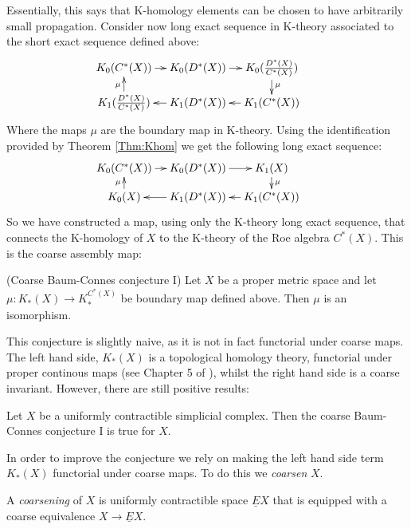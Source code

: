 Essentially, this says that K-homology elements can be chosen to have arbitrarily small propagation. Consider now long exact sequence in K-theory associated to the short exact sequence defined above:
\begin{equation*}
\xymatrix@=1em{
K_{0}(C^{*}(X)) \ar[r] & K_{0}(D^{*}(X)) \ar[r]& K_{0}(\frac{D^{*}(X)}{C^{*}(X)})\ar[d]^{\mu} & \\
K_{1}(\frac{D^{*}(X)}{C^{*}(X)})\ar[u]^{\mu}& K_{1}(D^{*}(X)) \ar[l]& K_{1}(C^{*}(X))\ar[l] &
}
\end{equation*}
Where the maps $\mu$ are the boundary map in K-theory. Using the identification provided by Theorem \ref{Thm:Khom} we get the following long exact sequence:
\begin{equation*}
\xymatrix@=1em{
K_{0}(C^{*}(X)) \ar[r] & K_{0}(D^{*}(X)) \ar[r]& K_{1}(X)\ar[d]^{\mu} & \\
K_{0}(X)\ar[u]^{\mu}& K_{1}(D^{*}(X)) \ar[l]& K_{1}(C^{*}(X))\ar[l] &
}
\end{equation*}
So we have constructed a map, using only the K-theory long exact sequence, that connects the K-homology of $X$ to the K-theory of the Roe algebra $C^{*}(X)$. This is the coarse assembly map:
\begin{conjecture}\label{conj:CBC1}(Coarse Baum-Connes conjecture I)
Let $X$ be a proper metric space and let $\mu: K_{*}(X) \rightarrow K_{*}^{C^{*}(X)}$ be boundary map defined above. Then $\mu$ is an isomorphism.
\end{conjecture}
This conjecture is slightly naive, as it is not in fact functorial under coarse maps. The left hand side, $K_{*}(X)$ is a topological homology theory, functorial under proper continous maps (see Chapter 5 of \cite{MR1399087}), whilst the right hand side is a coarse invariant. However, there are still positive results:

\begin{theorem}
Let $X$ be a uniformly contractible simplicial complex. Then the coarse Baum-Connes conjecture I is true for $X$.
\end{theorem}

In order to improve the conjecture we rely on making the left hand side term $K_{*}(X)$ functorial under coarse maps. To do this we \textit{coarsen} $X$.

\begin{definition}
A \textit{coarsening} of $X$ is uniformly contractible space $\underline{E}X$ that is equipped with a coarse equivalence $X \rightarrow \underline{E}X$. 
\end{definition}

